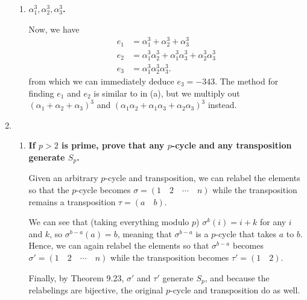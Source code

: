 \documentclass[12pt]{article}
\begin{document}
\begin{enumerate}
\begin{enumerate}
            \item
                \boldmath\textbf{$\alpha_1^3, \alpha_2^3, \alpha_3^3$.
                }\unboldmath \par
                Now, we have
                \begin{align*}
                    e_1 &= \alpha_1^3 + \alpha_2^3 + \alpha_3^3 \\
                    e_2 &= \alpha_1^3\alpha_2^3 + \alpha_1^3\alpha_3^3 + \alpha_2^3\alpha_3^3 \\
                    e_3 &= \alpha_1^3\alpha_2^3\alpha_3^3.
                \end{align*}
                from which we can immediately deduce $e_3 = -343$. The method for finding $e_1$ and $e_2$ is similar to in (a), but we multiply out $(\alpha_1 + \alpha_2 + \alpha_3)^3$ and $(\alpha_1\alpha_2 + \alpha_1\alpha_3 + \alpha_2\alpha_3)^3$ instead.
        \end{enumerate}

    \item
    \begin{enumerate}
        \item
            \boldmath\textbf{If $p > 2$ is prime, prove that any $p$-cycle and any transposition generate $S_p$.
            }\unboldmath \par
            Given an arbitrary $p$-cycle and transposition, we can relabel the elements so that the $p$-cycle becomes $\sigma = (1 \quad 2 \quad \cdots \quad n)$ while the transposition remains a transposition $\tau = (a \quad b)$. \par
            We can see that (taking everything modulo $p$) $\sigma^k(i) = i + k$ for any $i$ and $k$, so $\sigma^{b - a}(a) = b$, meaning that $\sigma^{b - a}$ is a $p$-cycle that takes $a$ to $b$. Hence, we can again relabel the elements so that $\sigma^{b - a}$ becomes $\sigma' = (1 \quad 2 \quad \cdots \quad n)$ while the transposition becomes $\tau' = (1 \quad 2)$. \par
            Finally, by Theorem 9.23, $\sigma'$ and $\tau'$ generate $S_p$, and because the relabelings are bijective, the original $p$-cycle and transposition do as well.


\end{enumerate}
\end{enumerate}
\end{document}
